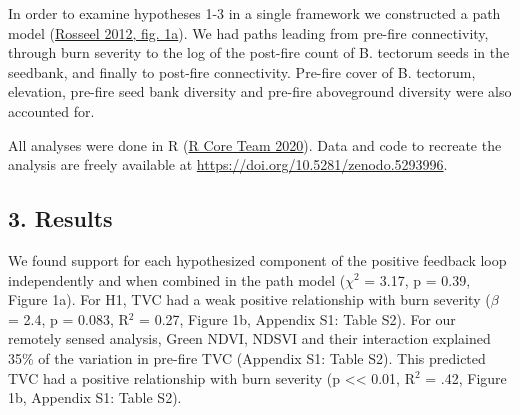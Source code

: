 \documentclass[
  12pt,
]{article}
\begin{document}
In order to examine hypotheses 1-3 in a single framework we constructed
a path model (\protect\hyperlink{ref-Rosseel2012}{Rosseel 2012, fig.
1a}). We had paths leading from pre-fire connectivity, through burn
severity to the log of the post-fire count of B. tectorum seeds in the
seedbank, and finally to post-fire connectivity. Pre-fire cover of B.
tectorum, elevation, pre-fire seed bank diversity and pre-fire
aboveground diversity were also accounted for.

All analyses were done in R (\protect\hyperlink{ref-R}{R Core Team
2020}). Data and code to recreate the analysis are freely available at
\url{https://doi.org/10.5281/zenodo.5293996}.

\hypertarget{results}{%
\subsection{3. Results}\label{results}}

We found support for each hypothesized component of the positive
feedback loop independently and when combined in the path model
(\(\chi^2\) = 3.17, p = 0.39, Figure 1a). For H1, TVC had a weak
positive relationship with burn severity (\(\beta\) = 2.4, p = 0.083,
R\(^2\) = 0.27, Figure 1b, Appendix S1: Table S2). For our remotely
sensed analysis, Green NDVI, NDSVI and their interaction explained 35\%
of the variation in pre-fire TVC (Appendix S1: Table S2). This predicted
TVC had a positive relationship with burn severity (p
\textless\textless{} 0.01, R\(^2\) = .42, Figure 1b, Appendix S1: Table
S2).
\end{document}
